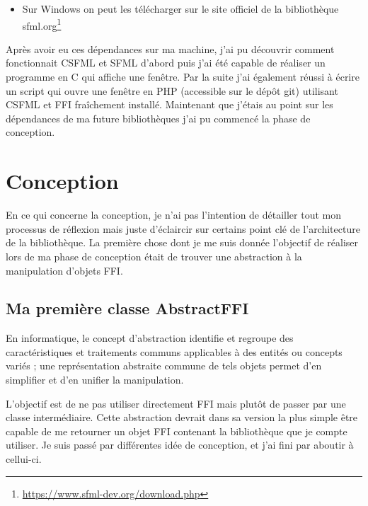 \documentclass[11pt,a4paper,krantz2,11pt,oneside]{krantz}
\providecommand{\tightlist}{%
  \setlength{\itemsep}{0pt}\setlength{\parskip}{0pt}}
\renewenvironment{quote}{\begin{VF}}{\end{VF}}
\renewcommand{\href}[2]{#2\footnote{\url{#1}}}
\begin{document}
\begin{itemize}
\tightlist
\item
  Sur Windows on peut les télécharger sur le site officiel de la bibliothèque \href{https://www.sfml-dev.org/download.php}{sfml.org}
\end{itemize}

Après avoir eu ces dépendances sur ma machine, j'ai pu découvrir comment fonctionnait CSFML et SFML d'abord puis j'ai été capable de réaliser un programme en C qui affiche une fenêtre. Par la suite j'ai également réussi à écrire un script qui ouvre une fenêtre en PHP (accessible sur le dépôt git) utilisant CSFML et FFI fraîchement installé. Maintenant que j'étais au point sur les dépendances de ma future bibliothèques j'ai pu commencé la phase de conception.

\hypertarget{conception}{%
\section{Conception}\label{conception}}

En ce qui concerne la conception, je n'ai pas l'intention de détailler tout mon processus de réflexion mais juste d'éclaircir sur certains point clé de l'architecture de la bibliothèque. La première chose dont je me suis donnée l'objectif de réaliser lors de ma phase de conception était de trouver une abstraction à la manipulation d'objets FFI.

\hypertarget{ma-premiuxe8re-classe-abstractffi}{%
\subsection{Ma première classe AbstractFFI}\label{ma-premiuxe8re-classe-abstractffi}}

\begin{quote}
En informatique, le concept d'abstraction identifie et regroupe des caractéristiques et traitements communs applicables à des entités ou concepts variés ; une représentation abstraite commune de tels objets permet d'en simplifier et d'en unifier la manipulation.

\end{quote}

L'objectif est de ne pas utiliser directement FFI mais plutôt de passer par une classe intermédiaire. Cette abstraction devrait dans sa version la plus simple être capable de me retourner un objet FFI contenant la bibliothèque que je compte utiliser. Je suis passé par différentes idée de conception, et j'ai fini par aboutir à cellui-ci.
\end{document}
